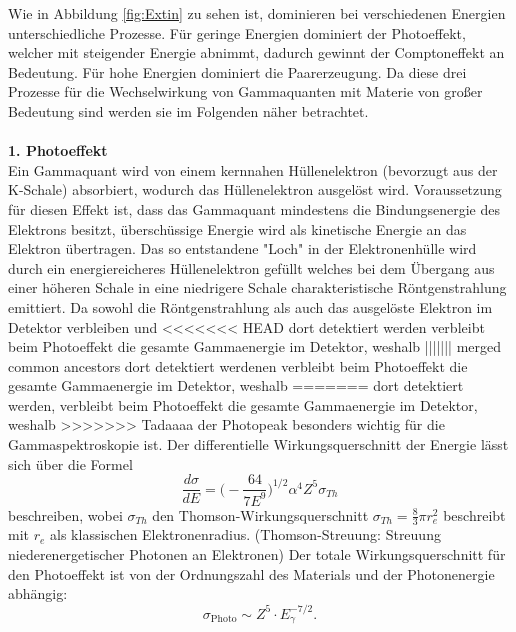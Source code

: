 Wie in Abbildung \ref{fig:Extin} zu sehen ist, dominieren bei verschiedenen Energien
unterschiedliche Prozesse. Für geringe Energien dominiert der Photoeffekt, welcher mit
steigender Energie abnimmt, dadurch gewinnt der Comptoneffekt an Bedeutung. Für hohe
Energien dominiert die Paarerzeugung.
Da diese drei Prozesse für die Wechselwirkung von Gammaquanten mit Materie von großer Bedeutung sind
werden sie im Folgenden näher betrachtet.
\cite{Springer3}
\\
\\
\textbf{1. Photoeffekt}\\
Ein Gammaquant wird von einem kernnahen Hüllenelektron (bevorzugt aus der K-Schale) absorbiert,
wodurch das Hüllenelektron ausgelöst wird. Voraussetzung für diesen Effekt ist, dass das Gammaquant
mindestens die Bindungsenergie des Elektrons besitzt, überschüssige Energie wird als kinetische
Energie an das Elektron übertragen.
Das so entstandene "Loch" in der Elektronenhülle wird durch ein energiereicheres Hüllenelektron
gefüllt welches bei dem Übergang aus einer höheren Schale in eine niedrigere Schale
charakteristische Röntgenstrahlung emittiert.
Da sowohl die Röntgenstrahlung als auch das ausgelöste Elektron im Detektor verbleiben und
<<<<<<< HEAD
dort detektiert werden verbleibt beim Photoeffekt die gesamte Gammaenergie im Detektor, weshalb
||||||| merged common ancestors
dort detektiert werdenen verbleibt beim Photoeffekt die gesamte Gammaenergie im Detektor, weshalb
=======
dort detektiert werden, verbleibt beim Photoeffekt die gesamte Gammaenergie im Detektor, weshalb
>>>>>>> Tadaaaa
der Photopeak besonders wichtig für die Gammaspektroskopie ist.
Der differentielle Wirkungsquerschnitt der Energie lässt sich über die Formel
\begin{equation}
  \frac{d \sigma}{d E} = \bigg(-\frac{64}{7E^{9}}\bigg)^{1/2}\alpha^4 Z^5\sigma_{Th}
  \label{eqn:diffPhoto}
\end{equation}
beschreiben, wobei $\sigma_{Th}$ den Thomson-Wirkungsquerschnitt $\sigma_{Th} = \frac{8}{3}\pi r_{e}^2$
beschreibt mit $r_e$ als klassischen Elektronenradius.
(Thomson-Streuung: Streuung niederenergetischer Photonen an Elektronen) \cite{Springer3}
Der totale Wirkungsquerschnitt für den Photoeffekt ist von der Ordnungszahl des Materials
und der Photonenergie abhängig:
\begin{equation}
  \sigma_{\text{Photo}}\sim Z^5\cdot E_{\gamma}^{-7/2}.
  \label{eqn:WQphoto}
\end{equation}
\cite{Karlsruhe}
\\
\\
